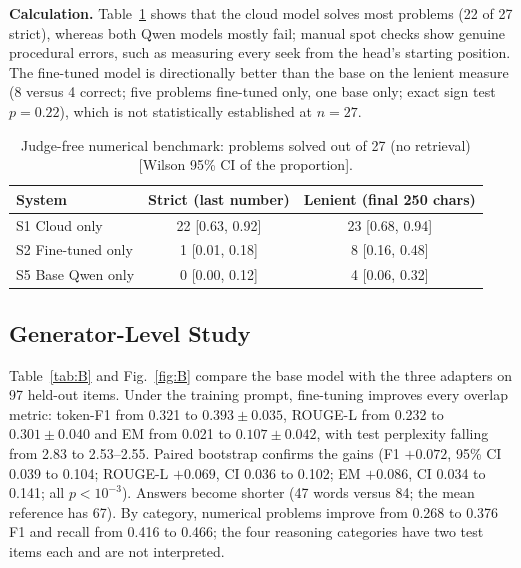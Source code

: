 \documentclass[conference]{IEEEtran}
\begin{document}
\textbf{Calculation.} Table~\ref{tab:num} shows that the cloud model solves most problems (22 of 27 strict), whereas both Qwen models mostly fail; manual spot checks show genuine procedural errors, such as measuring every seek from the head's starting position. The fine-tuned model is directionally better than the base on the lenient measure (8 versus 4 correct; five problems fine-tuned only, one base only; exact sign test $p=0.22$), which is not statistically established at $n=27$.

\begin{table}[t]
\caption{Judge-free numerical benchmark: problems solved out of 27 (no retrieval) [Wilson 95\% CI of the proportion].}
\label{tab:num}
\centering
\small
\setlength{\tabcolsep}{3pt}
\begin{tabular}{lcc}
\toprule
System & Strict (last number) & Lenient (final 250 chars) \\
\midrule
S1 Cloud only      & 22 [0.63, 0.92] & 23 [0.68, 0.94] \\
S2 Fine-tuned only & 1 [0.01, 0.18]  & 8 [0.16, 0.48] \\
S5 Base Qwen only  & 0 [0.00, 0.12]  & 4 [0.06, 0.32] \\
\bottomrule
\end{tabular}
\end{table}

\subsection{Generator-Level Study}\label{sec:resB}
Table~\ref{tab:B} and Fig.~\ref{fig:B} compare the base model with the three adapters on 97 held-out items. Under the training prompt, fine-tuning improves every overlap metric: token-F1 from 0.321 to $0.393\pm0.035$, ROUGE-L from 0.232 to $0.301\pm0.040$ and EM from 0.021 to $0.107\pm0.042$, with test perplexity falling from 2.83 to 2.53--2.55. Paired bootstrap confirms the gains (F1 $+0.072$, 95\% CI 0.039 to 0.104; ROUGE-L $+0.069$, CI 0.036 to 0.102; EM $+0.086$, CI 0.034 to 0.141; all $p<10^{-3}$). Answers become shorter (47 words versus 84; the mean reference has 67). By category, numerical problems improve from 0.268 to 0.376 F1 and recall from 0.416 to 0.466; the four reasoning categories have two test items each and are not interpreted.
\end{document}
